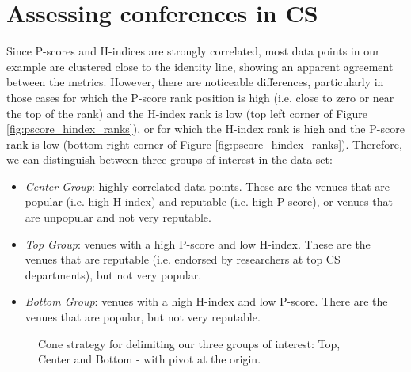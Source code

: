 \documentclass[man]{apa6}
\begin{document}
\section{Assessing conferences in CS}
\label{sec:notifications}

Since P-scores and H-indices are strongly correlated, most data points in our example are clustered close to the identity 
line, showing an apparent agreement between the metrics. However, there are noticeable differences, 
particularly in those cases for which the P-score rank position is high (i.e. close to zero or near the top of the rank) and the H-index rank is low 
(top left corner of Figure \ref{fig:pscore_hindex_ranks}), or for which the H-index rank is high and the 
P-score rank is low (bottom right corner of Figure \ref{fig:pscore_hindex_ranks}). Therefore, we 
can distinguish between three groups of interest in the data set:

\begin{itemize}
\item \textit{Center Group}: highly correlated data points. These are the venues that are popular (i.e. high H-index) and reputable (i.e. high P-score), or venues that are unpopular and not very reputable.
\item \textit{Top Group}: venues with a high P-score and low H-index. These are the venues that are reputable (i.e. endorsed by researchers at top CS departments), but not very popular.
\item \textit{Bottom Group}: venues with a high H-index and low P-score. There are the venues that are popular, but not very reputable.

\end{itemize}

\begin{figure}[h!]
  \begin{center}
    \caption{Cone strategy for delimiting our three groups of interest: Top, Center and Bottom - with pivot at the origin.}
    \label{fig:cone_strategy}
  \end{center}
\end{figure}
\end{document}
